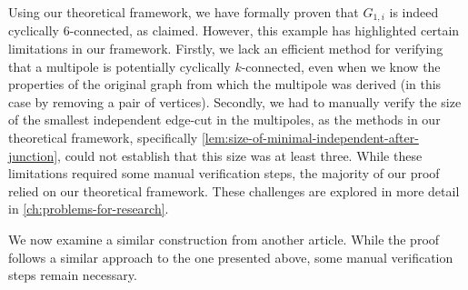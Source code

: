 \documentclass[12pt, twoside]{book}
\begin{document}
Using our theoretical framework, we have formally proven that $G_{1,i}$ is indeed cyclically 6-connected, as claimed. However, this example has highlighted certain limitations in our framework. Firstly, we lack an efficient method for verifying that a multipole is potentially cyclically $k$-connected, even when we know the properties of the original graph from which the multipole was derived (in this case by removing a pair of vertices). Secondly, we had to manually verify the size of the smallest independent edge-cut in the multipoles, as the methods in our theoretical framework, specifically \cref{lem:size-of-minimal-independent-after-junction}, could not establish that this size was at least three. While these limitations required some manual verification steps, the majority of our proof relied on our theoretical framework. These challenges are explored in more detail in \cref{ch:problems-for-research}.

We now examine a similar construction from another article. While the proof follows a similar approach to the one presented above, some manual verification steps remain necessary.
\end{document}
